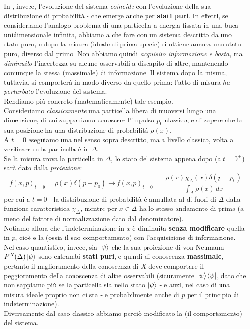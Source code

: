 \documentclass[../../FisicaTeorica.tex]{subfiles}
\begin{document}
In \MQ, invece, l'evoluzione del sistema \textit{coincide} con l'evoluzione della sua distribuzione di probabilità - che emerge anche per \textbf{stati puri}. In effetti, se consideriamo l'analogo problema di una particella a energia fissata in una buca unidimensionale infinita, abbiamo a che fare con un sistema descritto da uno stato puro, e dopo la misura (ideale di prima specie) si ottiene ancora uno stato puro, diverso dal primo. Non abbiamo quindi \textit{acquisito informazione e basta}, ma \textit{diminuito} l'incertezza su alcune osservabili a discapito di altre, mantenendo comunque la stessa  (massimale) di informazione. Il sistema dopo la misura, tuttavia, si comporterà in modo diverso da quello prima: l'atto di misura \textit{ha perturbato} l'evoluzione del sistema.\\

Rendiamo più concreto (matematicamente) tale esempio.\\
Consideriamo \textit{classicamente} una particella libera di muoversi lungo una dimensione, di cui supponiamo conoscere l'impulso $p_0$ classico, e di sapere che la sua posizione ha una distribuzione di probabilità $\rho(x)$.\\
A $t=0$ eseguiamo una  nel senso sopra descritto, ma a livello classico, volta a verificare se la particella è in $\Delta$.\\
Se la misura trova la particella in $\Delta$, lo stato del sistema appena dopo (a $t=0^+$) sarà dato dalla \textit{proiezione}:
\[
f(x,p)_{t=0} = \rho(x)\delta(p-p_0)\to 
f(x,p)_{t=0^+} =
\frac{\rho(x)\chi_\Delta(x)\delta(p-p_0)}{\displaystyle \int_\Delta \rho(x)\,dx}
\]
per cui a $t=0^+$ la distribuzione di probabilità è annullata al di fuori di $\Delta$ dalla funzione caratteristica $\chi_\Delta$, mentre per $x\in \Delta$ ha lo stesso andamento di prima (a meno del fattore di normalizzazione dato dal denominatore).\\
Notiamo allora che l'indeterminazione in $x$ è diminuita \textbf{senza modificare} quella in $p$, cioè e la  (ossia il suo comportamento) con l'acquisizione di informazione.\\

Nel caso quantistico, invece, sia $\ket{\psi}$ che la sua proiezione di von Neumann $P^X(\Delta)\ket{\psi}$ sono entrambi \textbf{stati puri}, e quindi di conoscenza \textbf{massimale}, pertanto il miglioramento della conoscenza di $X$ deve comportare il peggioramento della conoscenza di altre osservabili (sicuramente $\ket{\psi}\bra{\psi}$, dato che non sappiamo più se la particella sia nello stato $\ket{\psi}$ - e anzi, nel caso di una misura ideale proprio non ci sta - e probabilmente anche di $p$ per il principio di indeterminazione).\\
Diversamente dal caso classico abbiamo perciò modificato la  (il comportamento) del sistema.\\
\end{document}
